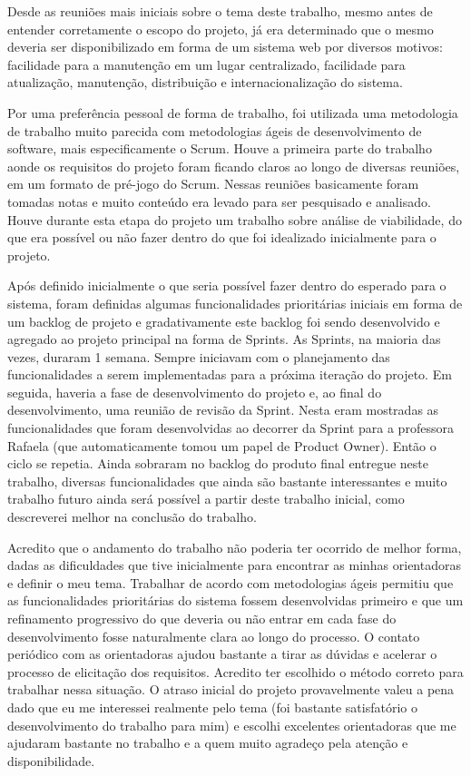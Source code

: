 \documentclass{abnt}
\begin{document}
Desde as reuniões mais iniciais sobre o tema deste trabalho, mesmo antes de entender corretamente o escopo do projeto, já era determinado que o mesmo deveria ser disponibilizado em forma de um sistema web por diversos motivos: facilidade para a manutenção em um lugar centralizado, facilidade para atualização, manutenção, distribuição e internacionalização do sistema.

Por uma preferência pessoal de forma de trabalho, foi utilizada uma metodologia de trabalho muito parecida com metodologias ágeis de desenvolvimento de software, mais especificamente o Scrum. Houve a primeira parte do trabalho aonde os requisitos do projeto foram ficando claros ao longo de diversas reuniões, em um formato de pré-jogo do Scrum. Nessas reuniões basicamente foram tomadas notas e muito conteúdo era levado para ser pesquisado e analisado. Houve durante esta etapa do projeto um trabalho sobre análise de viabilidade, do que era possível ou não fazer dentro do que foi idealizado inicialmente para o projeto.

Após definido inicialmente o que seria possível fazer dentro do esperado para o sistema, foram definidas algumas funcionalidades prioritárias iniciais em forma de um backlog de projeto e gradativamente este backlog foi sendo desenvolvido e agregado ao projeto principal na forma de Sprints. As Sprints, na maioria das vezes, duraram 1 semana. Sempre iniciavam com o planejamento das funcionalidades a serem implementadas para a próxima iteração do projeto. Em seguida, haveria a fase de desenvolvimento do projeto e, ao final do desenvolvimento, uma reunião de revisão da Sprint. Nesta eram mostradas as funcionalidades que foram desenvolvidas ao decorrer da Sprint para a professora Rafaela (que automaticamente tomou um papel de Product Owner). Então o ciclo se repetia. Ainda sobraram no backlog do produto final entregue neste trabalho, diversas funcionalidades que ainda são bastante interessantes e muito trabalho futuro ainda será possível a partir deste trabalho inicial, como descreverei melhor na conclusão do trabalho.

Acredito que o andamento do trabalho não poderia ter ocorrido de melhor forma, dadas as dificuldades que tive inicialmente para encontrar as minhas orientadoras e definir o meu tema. Trabalhar de acordo com metodologias ágeis permitiu que as funcionalidades prioritárias do sistema fossem desenvolvidas primeiro e que um refinamento progressivo do que deveria ou não entrar em cada fase do desenvolvimento fosse naturalmente clara ao longo do processo. O contato periódico com as orientadoras ajudou bastante a tirar as dúvidas e acelerar o processo de elicitação dos requisitos. Acredito ter escolhido o método correto para trabalhar nessa situação. O atraso inicial do projeto provavelmente valeu a pena dado que eu me interessei realmente pelo tema (foi bastante satisfatório o desenvolvimento do trabalho para mim) e escolhi excelentes orientadoras que me ajudaram bastante no trabalho e a quem muito agradeço pela atenção e disponibilidade.
\end{document}
